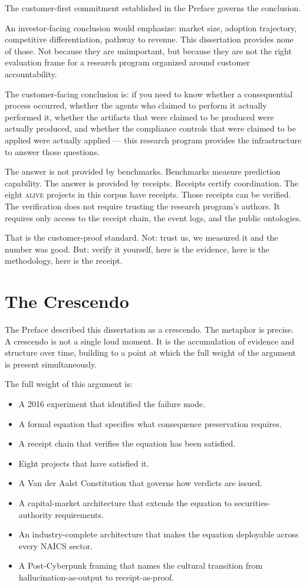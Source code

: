 The customer-first commitment established in the Preface governs the conclusion.

An investor-facing conclusion would emphasize: market size, adoption trajectory, competitive differentiation, pathway to revenue. This dissertation provides none of those. Not because they are unimportant, but because they are not the right evaluation frame for a research program organized around customer accountability.

The customer-facing conclusion is: if you need to know whether a consequential process occurred, whether the agents who claimed to perform it actually performed it, whether the artifacts that were claimed to be produced were actually produced, and whether the compliance controls that were claimed to be applied were actually applied --- this research program provides the infrastructure to answer those questions.

The answer is not provided by benchmarks. Benchmarks measure prediction capability. The answer is provided by receipts. Receipts certify coordination. The eight \textsc{alive} projects in this corpus have receipts. Those receipts can be verified. The verification does not require trusting the research program's authors. It requires only access to the receipt chain, the event logs, and the public ontologies.

That is the customer-proof standard. Not: trust us, we measured it and the number was good. But: verify it yourself, here is the evidence, here is the methodology, here is the receipt.

\section{The Crescendo}

The Preface described this dissertation as a crescendo. The metaphor is precise. A crescendo is not a single loud moment. It is the accumulation of evidence and structure over time, building to a point at which the full weight of the argument is present simultaneously.

The full weight of this argument is:

\begin{itemize}
  \item A 2016 experiment that identified the failure mode.
  \item A formal equation that specifies what consequence preservation requires.
  \item A receipt chain that verifies the equation has been satisfied.
  \item Eight projects that have satisfied it.
  \item A Van der Aalst Constitution that governs how verdicts are issued.
  \item A capital-market architecture that extends the equation to securities-authority requirements.
  \item An industry-complete architecture that makes the equation deployable across every NAICS sector.
  \item A Post-Cyberpunk framing that names the cultural transition from hallucination-as-output to receipt-as-proof.
\end{itemize}

